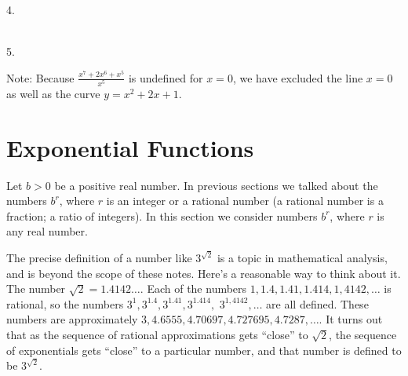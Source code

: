 \documentclass[11pt]{book}               %
\begin{document}
4.  \\
5.   

Note: Because $\frac{x^7 + 2x^6 + x^5}{x^5}$ is undefined for $x=0$, we have excluded the line $x=0$ as well as the curve $y=x^2+2x+1$.

\newpage
\section{Exponential Functions}


Let $b > 0$ be a positive real number.
In previous sections we talked about the numbers $b^r$, where $r$ is an integer or a rational number (a rational number is a fraction; a ratio of integers).
In this section we consider numbers $b^r$, where $r$ is any real number.  

The precise definition of a number like $3^{\sqrt{2}}$ is a topic in mathematical analysis, and is beyond
the scope of these notes.  Here's a reasonable way to think about it.
The number $\sqrt{2} = 1.4142\ldots$.
Each of the numbers $1, 1.4, 1.41, 1.414, 1,4142, \ldots$ is rational, so the numbers
$3^1, 3^{1.4}, 3^{1.41}, 3^{1.414}, $ $3^{1,4142}, \ldots$ are all defined.
These numbers are approximately $3, 4.6555, 4.70697, 4.727695, 4.7287, \ldots$.
It turns out that as the sequence of rational approximations gets ``close'' to $\sqrt{2}$,
the sequence of exponentials gets ``close'' to a particular number, and that number is
defined to be $3^{\sqrt{2}}$.
\end{document}
